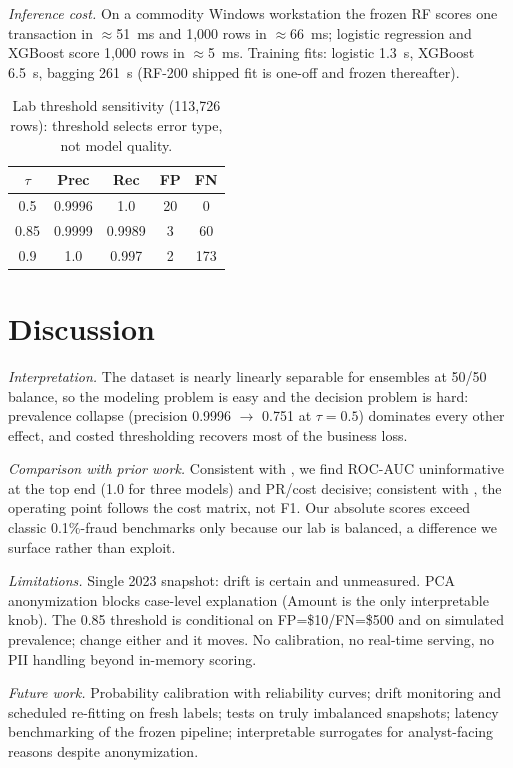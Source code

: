 \documentclass[conference]{IEEEtran}
\begin{document}
\emph{Inference cost.} On a commodity Windows workstation the frozen
RF scores one transaction in $\approx$51~ms and 1,000 rows in
$\approx$66~ms; logistic regression and XGBoost score 1,000 rows in
$\approx$5~ms. Training fits: logistic 1.3~s, XGBoost 6.5~s, bagging
261~s (RF-200 shipped fit is one-off and frozen thereafter).

\begin{table}[htbp]
\caption{Lab threshold sensitivity (113,726 rows): threshold selects
error type, not model quality.}
\label{tab:labthr}
\begin{center}
\begin{tabular}{ccccc}
\toprule
$\tau$ & Prec & Rec & FP & FN \\
\midrule
0.5 & 0.9996 & 1.0 & 20 & 0 \\
0.85 & 0.9999 & 0.9989 & 3 & 60 \\
0.9 & 1.0 & 0.997 & 2 & 173 \\
\bottomrule
\end{tabular}
\end{center}
\end{table}

\section{Discussion}
\emph{Interpretation.} The dataset is nearly linearly separable for
ensembles at 50/50 balance, so the modeling problem is easy and the
decision problem is hard: prevalence collapse (precision 0.9996
$\to$ 0.751 at $\tau=0.5$) dominates every other effect, and costed
thresholding recovers most of the business loss.

\emph{Comparison with prior work.} Consistent with
\cite{pozzi2015,calibrating2015}, we find ROC-AUC uninformative at the
top end (1.0 for three models) and PR/cost decisive; consistent with
\cite{bahnsen2015}, the operating point follows the cost matrix, not
F1. Our absolute scores exceed classic 0.1\%-fraud benchmarks only
because our lab is balanced, a difference we surface rather than
exploit.

\emph{Limitations.} Single 2023 snapshot: drift is certain and
unmeasured. PCA anonymization blocks case-level explanation (Amount
is the only interpretable knob). The 0.85 threshold is conditional on
FP=\$10/FN=\$500 and on simulated prevalence; change either and it
moves. No calibration, no real-time serving, no PII handling beyond
in-memory scoring.

\emph{Future work.} Probability calibration with reliability curves;
drift monitoring and scheduled re-fitting on fresh labels; tests on
truly imbalanced snapshots; latency benchmarking of the frozen
pipeline; interpretable surrogates for analyst-facing reasons despite
anonymization.
\end{document}
